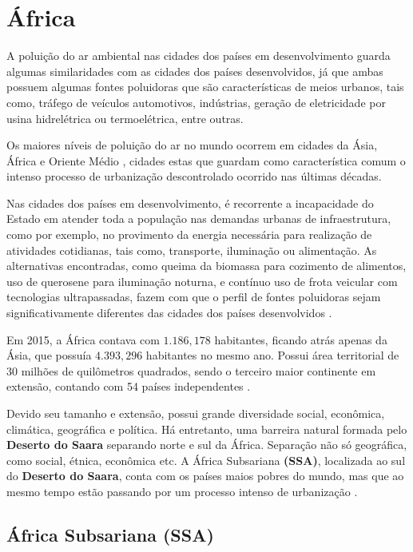 \section{África}

A poluição do ar ambiental nas cidades dos países em desenvolvimento
guarda algumas similaridades com as cidades dos países desenvolvidos, já que 
ambas possuem algumas fontes poluidoras que são características de meios urbanos, 
tais como, tráfego de veículos automotivos, indústrias, geração de 
eletricidade por usina hidrelétrica ou termoelétrica, entre outras. 

Os maiores níveis de poluição do ar no mundo ocorrem em cidades da Ásia, 
África e Oriente Médio \citep{brauer2012}, cidades estas que guardam como 
característica comum o intenso processo de urbanização descontrolado 
ocorrido nas últimas décadas. 

Nas cidades dos países em desenvolvimento, é recorrente a incapacidade do Estado em atender 
toda a população nas demandas urbanas de infraestrutura, como por exemplo, no provimento da 
energia necessária para realização de atividades cotidianas, 
tais como, transporte, iluminação ou alimentação. As alternativas encontradas, como
queima da biomassa para cozimento de alimentos, uso de querosene para iluminação 
noturna, e contínuo uso de frota veicular com tecnologias ultrapassadas, 
fazem com que o perfil de fontes poluidoras sejam significativamente 
diferentes das cidades dos países desenvolvidos \citep{brauer2012}.

Em 2015, a África contava com $1.186,178$ habitantes, ficando atrás 
apenas da Ásia, que possuía $4.393,296$ habitantes no mesmo ano. 
Possui área territorial de 30 milhões de quilômetros quadrados, sendo
o terceiro maior continente em extensão, contando com 54 países 
independentes \citep{UN}.

Devido seu tamanho e extensão, possui grande diversidade social, 
econômica, climática, geográfica e política. 
Há entretanto, uma barreira natural formada pelo \textbf{Deserto do Saara}
separando norte e sul da África. Separação não só geográfica, como
social, étnica, econômica etc. 
A África Subsariana \textbf{(SSA)}, localizada ao sul do \textbf{Deserto do Saara}, 
conta com os países maios pobres do mundo, mas que ao mesmo tempo estão
passando por um processo intenso de urbanização \citep{UN}. 
   	
\subsection{África Subsariana \textbf{(SSA)}}

